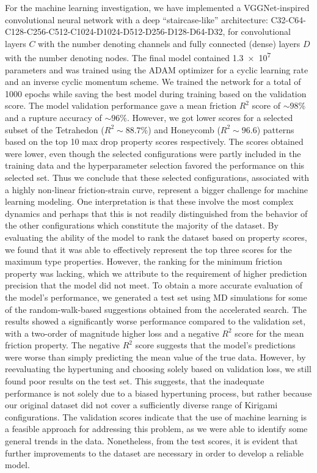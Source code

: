 For the machine learning investigation, we have implemented a VGGNet-inspired
convolutional neural network with a deep ``staircase-like'' architecture:
C32-C64-C128-C256-C512-C1024-D1024-D512-D256-D128-D64-D32, for convolutional
layers $C$ with the number denoting channels and fully connected (dense) layers
$D$ with the number denoting nodes. The final model contained \num{1.3e7}
parameters and was trained using the ADAM optimizer for a cyclic learning rate
and an inverse cyclic momentum scheme. We trained the network for a total of 1000 epochs while
saving the best model during training based on the validation score. The model
validation performance gave a mean friction $R^2$ score of $\sim 98\%$ and a
rupture accuracy of $\sim 96 \%$. However, we got lower scores for a selected
subset of the Tetrahedon ($R^2 \sim 88.7 \%$) and Honeycomb ($R^2 \sim 96.6$)
patterns based on the top 10 max drop property scores respectively. The scores
obtained were lower, even though the selected configurations were partly
included in the training data and the hyperparameter selection favored the
performance on this selected set. Thus we conclude that these selected
configurations, associated with a highly non-linear friction-strain curve,
represent a bigger challenge for machine learning modeling. One interpretation
is that these involve the most complex dynamics and perhaps that this is not
readily distinguished from the behavior of the other configurations which
constitute the majority of the dataset. By evaluating the ability of the model
to rank the dataset based on property scores, we found that it was able to
effectively represent the top three scores for the maximum type properties. However,
the ranking for the minimum friction property was lacking, which we attribute to
the requirement of higher prediction precision that the model did not meet. To
obtain a more accurate evaluation of the model's performance, we generated a
test set using \acrshort{MD} simulations for some of the random-walk-based
suggestions obtained from the accelerated search. The results showed a
significantly worse performance compared to the validation set, with a two-order
of magnitude higher loss and a negative $R^2$ score for the mean friction
property. The negative $R^2$ score suggests that the model's predictions were
worse than simply predicting the mean value of the true data. However, by
reevaluating the hypertuning and choosing solely based on validation loss, we
still found poor results on the test set. This suggests, that the inadequate
performance is not solely due to a biased hypertuning process,  but rather
because our original dataset did not cover a sufficiently diverse range of
Kirigami configurations. The validation scores indicate that the use of machine
learning is a feasible approach for addressing this problem, as we were able to
identify some general trends in the data. Nonetheless, from the test scores, it
is evident that further improvements to the dataset are necessary in order to
develop a reliable model.


